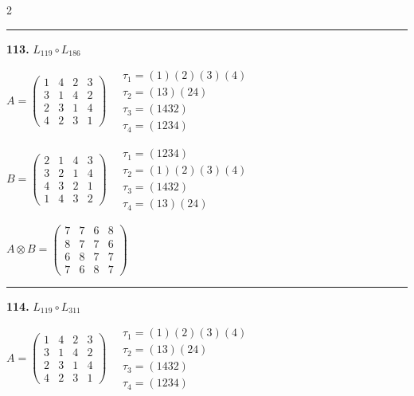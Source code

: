 \begin{multicols}{2}
\vspace{0.3em}
\hrule
\vspace{0.3em}

\noindent\textbf{113.} $L_{119} \circ L_{186}$

$A = \begin{pmatrix} 1 & 4 & 2 & 3 \\ 3 & 1 & 4 & 2 \\ 2 & 3 & 1 & 4 \\ 4 & 2 & 3 & 1 \end{pmatrix} \quad \begin{matrix} \tau_{1}=(1)(2)(3)(4) \\ \tau_{2}=(1 3)(2 4) \\ \tau_{3}=(1 4 3 2) \\ \tau_{4}=(1 2 3 4) \end{matrix}$

$B = \begin{pmatrix} 2 & 1 & 4 & 3 \\ 3 & 2 & 1 & 4 \\ 4 & 3 & 2 & 1 \\ 1 & 4 & 3 & 2 \end{pmatrix} \quad \begin{matrix} \tau_{1}=(1 2 3 4) \\ \tau_{2}=(1)(2)(3)(4) \\ \tau_{3}=(1 4 3 2) \\ \tau_{4}=(1 3)(2 4) \end{matrix}$

$A \otimes B = \begin{pmatrix} 7 & 7 & 6 & 8 \\ 8 & 7 & 7 & 6 \\ 6 & 8 & 7 & 7 \\ 7 & 6 & 8 & 7 \end{pmatrix}$

\vspace{0.3em}
\hrule
\vspace{0.3em}

\noindent\textbf{114.} $L_{119} \circ L_{311}$

$A = \begin{pmatrix} 1 & 4 & 2 & 3 \\ 3 & 1 & 4 & 2 \\ 2 & 3 & 1 & 4 \\ 4 & 2 & 3 & 1 \end{pmatrix} \quad \begin{matrix} \tau_{1}=(1)(2)(3)(4) \\ \tau_{2}=(1 3)(2 4) \\ \tau_{3}=(1 4 3 2) \\ \tau_{4}=(1 2 3 4) \end{matrix}$


\end{multicols}
